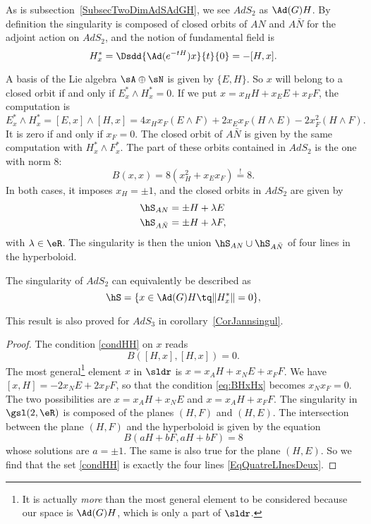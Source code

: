 As is subsection~\ref{SubsecTwoDimAdSAdGH}, we see $AdS_2$ as $\Ad(G)H$. By definition the singularity is composed of closed orbits of $AN$ and $A\bar{N}$ for the adjoint action on $AdS_2$, and the notion of fundamental field is
\begin{equation}
	H^*_x=\Dsdd{\Ad(e^{-tH})x}{t}{0} =-[H,x].
\end{equation}

A basis of the Lie algebra $\sA\oplus\sN$ is given by $\{E,H\}$. So $x$ will belong to a closed orbit if and only if $E_x^*\wedge H^*_x=0$. If we put $x=x_HH+x_EE+x_FF$, the computation is
\[
	E_x^*\wedge H^*_x=[E,x]\wedge[H,x]
	=4x_Hx_F (E\wedge F)+2x_Ex_F (H\wedge E)-2x_F^2 (H\wedge F).
\]
It is zero if and only if $x_F=0$. The closed orbit of $A\bar{N}$ is given by the same computation with $H^*_x\wedge F^*_x$. The part of these orbits contained in $AdS_2$ is the one with norm $8$:
\[
	B(x,x)=8(x_H^2+x_Ex_F)\stackrel{!}{=}8.
\]
In both cases, it imposes $x_H=\pm 1$, and the closed orbits in $AdS_2$ are given by
\begin{subequations}\label{EqQuatreLInesDeux}
	\begin{align}
		\hS_{AN}      & =\pm H+\lambda E  \\
		\hS_{A\bar N} & =\pm H+\lambda F,
	\end{align}
\end{subequations}
with $\lambda\in\eR$. The singularity is then the union $\hS_{AN}\cup\hS_{A\bar N}$ of four lines in the hyperboloid.

\begin{proposition} \label{PropAdSDeuxJannule}
	The singularity of $AdS_2$ can equivalently be described as
	\begin{equation}\label{condHH}
		\hS=\{x \in \Ad(G)H \tq \|H^*_x\|=0\},
	\end{equation}
\end{proposition}
This result is also proved for \( AdS_3\) in corollary~\ref{CorJannsingul}.

\begin{proof}
	The condition \eqref{condHH} on $x$ reads
	\begin{equation}\label{eq:BHxHx}
		B([H,x],[H,x])=0.
	\end{equation}
	The most general\footnote{It is actually \emph{more} than the most general element to be considered because our space is $\Ad(G)H$, which is only a part of $\sldr$.} element $x$ in $\sldr$ is $x=x_AH+x_NE+x_FF$. We have $[x,H]=-2x_NE+2x_FF$, so that the condition \eqref{eq:BHxHx} becomes $x_Nx_F=0$. The two possibilities are $x=x_AH+x_NE$ and $x=x_AH+x_FF$. The singularity in $\gsl(2,\eR)$ is composed of the planes $(H,F)$ and $(H,E)$. The intersection between the plane $(H,F)$ and the hyperboloid is given by the equation
	\[
		B(aH+bF,aH+bF)=8
	\]
	whose solutions are $a=\pm 1$. The same is also true for the plane $(H,E)$. So we find that the set \eqref{condHH} is exactly the four lines  \eqref{EqQuatreLInesDeux}.

\end{proof}

